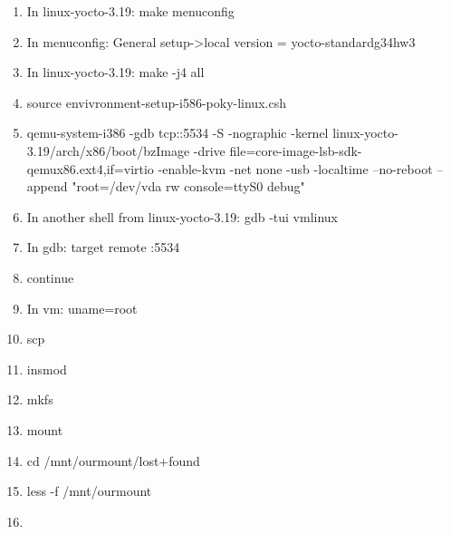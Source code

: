 \documentclass[titlepage,draftclsnofoot,onecolumn]{article}
\begin{document}
\begin{enumerate}
  \item In linux-yocto-3.19: make menuconfig
  \item In menuconfig: General setup->local version = yocto-standardg34hw3
  \item In linux-yocto-3.19: make -j4 all
  \item source envivronment-setup-i586-poky-linux.csh
  \item qemu-system-i386 -gdb tcp::5534 -S -nographic -kernel linux-yocto-3.19/arch/x86/boot/bzImage -drive file=core-image-lsb-sdk-qemux86.ext4,if=virtio -enable-kvm -net none -usb -localtime --no-reboot --append "root=/dev/vda rw console=ttyS0 debug"
  \item In another shell from linux-yocto-3.19: gdb -tui vmlinux
  \item In gdb: target remote :5534
  \item continue
  \item In vm: uname=root
  \item scp
  \item insmod
  \item mkfs
  \item mount
  \item cd /mnt/ourmount/lost+found
  \item less -f /mnt/ourmount
  \item
\end{enumerate}
\end{document}
